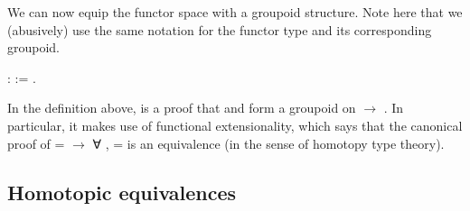 \noindent
    We can now equip the functor space with a groupoid structure. Note
    here that we (abusively) use the same notation for the functor type and 
    its corresponding groupoid. \begin{coqdoccode}
\coqdocemptyline
\coqdocnoindent
{}    :  := \coqdocnotation{(}   \coqdocnotation{;}   \coqdocnotation{)}.\coqdoceol
\coqdocemptyline
\end{coqdoccode}
 In the definition above,  is a proof that  and  form a groupoid on  $\longrightarrow$ . In particular, it makes use of functional extensionality, which says that the canonical proof of  =  \ensuremath{\rightarrow} ∀ ,   =   is an equivalence (in the sense of homotopy type theory).   
 \begin{coqdoccode}
\coqdocemptyline
\end{coqdoccode}
\subsection{Homotopic equivalences}


